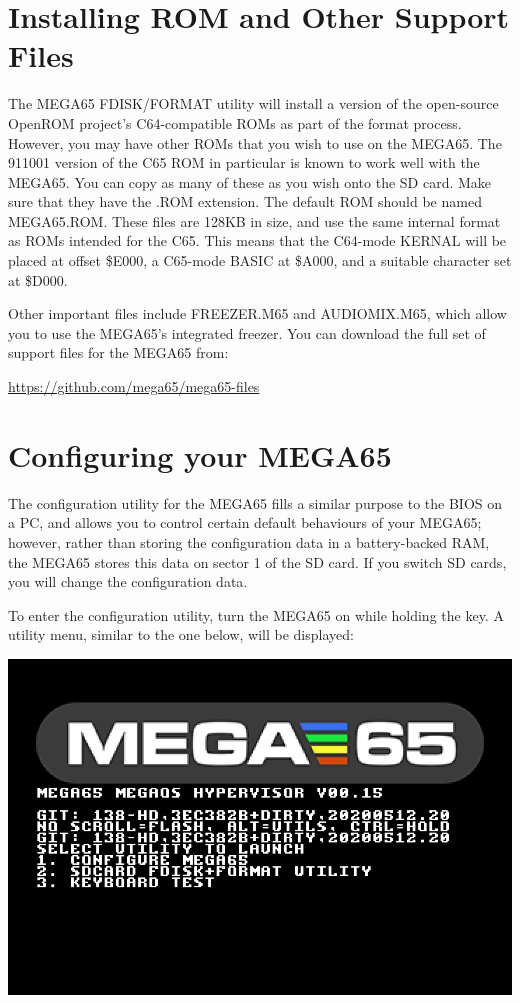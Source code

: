 \section{Installing ROM and Other Support Files}

The MEGA65 FDISK/FORMAT utility will install a version of the open-source OpenROM project's C64-compatible ROMs as part of the format process. However, you may have other ROMs that you wish to use on the MEGA65. The 911001 version of the C65 ROM in particular is known to work well with the MEGA65. You can copy as many of these as you wish onto the SD card.  Make sure that they have the .ROM extension. The default ROM should be named MEGA65.ROM. These files
are 128KB in size, and use the same internal format as ROMs intended for the C65. This means that the C64-mode KERNAL will be placed at offset \$E000, a C65-mode BASIC at \$A000, and a suitable character set at \$D000.

Other important files include FREEZER.M65 and AUDIOMIX.M65, which
allow you to use the MEGA65's integrated freezer. You can download
the full set of support files for the MEGA65 from:

\url{https://github.com/mega65/mega65-files}

\section{Configuring your MEGA65}

The configuration utility for the MEGA65 fills a similar purpose to the BIOS on a PC, and allows you to control certain default behaviours of your MEGA65; however, rather than storing the configuration data in a
battery-backed RAM, the MEGA65 stores this data on sector 1 of the SD card. If you switch SD cards, you will change the configuration data.

To enter the configuration utility, turn the MEGA65 on while holding the  key. A utility menu, similar to the one below, will be displayed:

\includegraphics[width=\linewidth]{images/ss-utilmenu.png}

